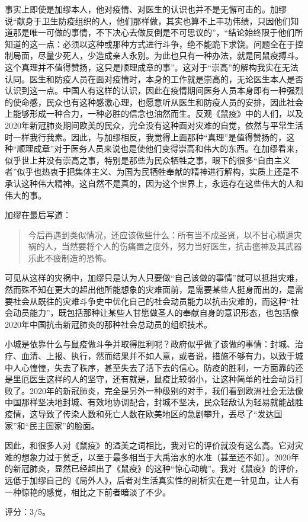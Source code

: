 事实上即使是加缪本人，他对疫情、对医生的认识也并不是无懈可击的。加缪说“献身于卫生防疫组织的人，他们那样做，其实也算不上丰功伟绩，只因他们知道那是唯一可做的事情，不下决心去做反倒是不可思议的”，“结论始终限于他们所知道的这一点：必须以这种或那种方式进行斗争，绝不能跪下求饶。问题全在于控制局面，尽量少死人，少造成亲人永别。为此也只有一种办法，就是同鼠疫搏斗。这个真理并不值得赞扬，这只是顺理成章的事”。这对于“崇高”的解构我实在无法认同。医生和防疫人员在面对疫情时，本身的工作就是崇高的，无论医生本人是否认识到这一点。中国人有这样的认识，因此在疫情期间医务人员本身即有一种强烈的使命感，民众也有这种感激心理，也愿意听从医生和防疫人员的安排，因此社会上能够形成一种合力，一种必胜的信念也油然而生。反观《鼠疫》中的人们，以及2020年新冠肺炎期间欧美的民众，完全没有这种面对灾难的自觉，依然与平常生活时一样我行我素。因此，与加缪相反，我觉得上面那种“真理”是值得赞扬的，这种“顺理成章”对于医务人员来说也是使他们变得崇高和伟大的东西。在加缪看来，似乎世上并没有崇高之事，特别是那些为民众牺牲之事，眼下的很多“自由主义者”似乎也热衷于把集体主义、为国为民牺牲奉献的精神进行解构，实质上还是不承认这种伟大精神。这自然不是真的，因为这个世界上，永远存在这些伟大的人和伟大的事。

加缪在最后写道：
\begin{quotation}
今后再遇到类似情况，还应该做些什么：所有当不成圣贤，以不甘心横遭灾祸的人，当然要将个人的伤痛置之度外，努力当好医生，抗击瘟神及其武器乐此不疲制造的恐怖。
\end{quotation}

可见从这样的灾祸中，加缪只是认为人只要做“自己该做的事情”就可以抵挡灾难，然而殊不知在更大的超出他所能想象的灾难面前，是需要某些人挺身而出的，是需要社会从既往的灾难斗争史中优化自己的社会动员能力以抗击灾难的，而这种“社会动员能力”，既包括那种让某些人甘愿做圣人的奉献自身的意识形态，也包括像2020年中国抗击新冠肺炎的那种社会总动员的组织技术。

小城是依靠什么与鼠疫做斗争并取得胜利呢？政府似乎做了该做的事情：封城、治疗、血清、上报、执行，然而结果并不如人意，或者说，措施不够有力，以致于城中人心惶惶，失去了秩序，甚至失去了活下去的信心。防疫的胜利，一方面靠的还是里厄医生这样的人的坚守，还有就是，鼠疫比较弱小，让这种简单的社会动员打败了。2020年的新冠肺炎，完全是另外一种级别的对手，我们看到欧洲社会无法像中国那样坚决地封城、有效地协调配合，封城不坚决，民众轻敌认为轻易就能战胜疫情，这导致了传染人数和死亡人数在欧美地区的急剧攀升，丢尽了“发达国家”和“民主国家”的脸面。

因此，和很多人对《鼠疫》的溢美之词相比，我对它的评价就没有这么高。它对灾难的想象力过于贫乏，以至于最多相当于大禹治水的水准（甚至还不如）。2020年的新冠肺炎，显然已经超出了《鼠疫》的这种“惊心动魄”。我对《鼠疫》的评价，远低于加缪自己的《局外人》，后者对生活真实性的剖析实在是一针见血，让人有一种惊艳的感觉，相比之下前者暗淡了不少。

评分：3/5。